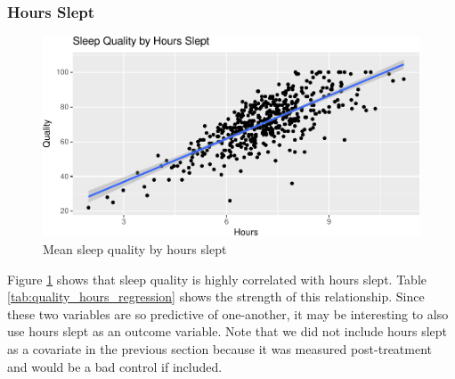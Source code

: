 \documentclass[12pt,]{article}
\begin{document}
\subsubsection{Hours Slept}\label{hours-slept}

\begin{figure}
\centering
\includegraphics{report_files/figure-latex/quality_by_hours_fig-1.pdf}
\caption{\label{fig:quality_by_hours_fig} Mean sleep quality by hours
slept}
\end{figure}

Figure \ref{fig:quality_by_hours_fig} shows that sleep quality is highly
correlated with hours slept. Table \ref{tab:quality_hours_regression}
shows the strength of this relationship. Since these two variables are
so predictive of one-another, it may be interesting to also use hours
slept as an outcome variable. Note that we did not include hours slept
as a covariate in the previous section because it was measured
post-treatment and would be a bad control if included.
\end{document}
